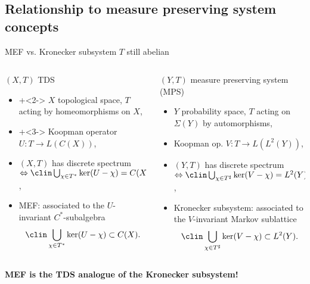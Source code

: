\subsection{Relationship to measure preserving system concepts}
\begin{frame}{MEF vs. Kronecker subsystem}
  $T$ still abelian
  \begin{columns}
    \begin{column}{0.5\textwidth}
      $(X,T)$ TDS
      \begin{itemize}
              \item \onslide+<2->
$X$ topological space, $T$ acting by homeomorphisms on $X$,
        \item \onslide+<3-> Koopman operator $U : T \to L(C(X))$,
        \item $(X,T)$ has discrete spectrum $\Leftrightarrow \clin \bigcup_{\chi \in T^*} \ker (U- \chi) = C(X)$,
        \item {} MEF: associated to the $U$-invariant $C^*$-subalgebra
          \begin{equation*}
            \clin \bigcup_{\chi \in T^*} \ker (U- \chi)  \subset C(X).
          \end{equation*}
      \end{itemize}
    \end{column}
\begin{column}{0.5\textwidth}
  $(Y,T)$ measure preserving system (MPS)
  \begin{itemize}
    \item $Y$ probability space, $T$ acting on $\Sigma (Y)$ by automorphisms,
    \item {} Koopman op. $V: T \to L(L^2(Y))$,
    \item $(Y,T)$ has discrete spectrum $\Leftrightarrow \clin \bigcup_{\chi \in T^\sharp} \ker (V- \chi) = L^2(Y)$,
    \item {} Kronecker subsystem: associated to the $V$-invariant Markov sublattice 
      \begin{equation*}
        \clin \bigcup_{\chi \in T^\sharp} \ker (V- \chi)  \subset L^2(Y).
      \end{equation*}
  \end{itemize}
    \end{column}
  \end{columns}
  \centering
  \textbf{MEF is the TDS analogue of the Kronecker subsystem!}
\end{frame}
